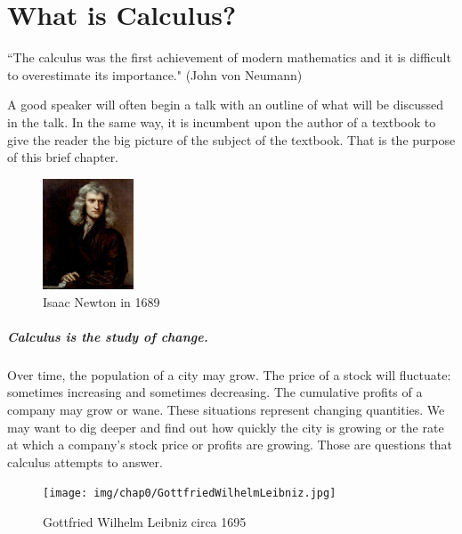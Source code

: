 \chapter{What is Calculus?}
\label{ch:whatiscalculus}

\begin{center}
``The calculus was the first achievement of modern mathematics and it is difficult to overestimate its importance." (John von Neumann)
\end{center}



A good speaker will often begin a talk with an outline of what will be discussed in the talk. In the same way, it is incumbent upon the author of a textbook to give the reader the big picture of the subject of the textbook. That is the purpose of this brief chapter.

\begin{figure}
  \vspace{-20pt}
  \centering
    \includegraphics[width=0.24\textwidth]{img/chap0/IsaacNewton.jpg}
\caption{Isaac Newton in 1689}
\vspace{-10pt}
\end{figure}

\paragraph{Calculus is the study of change.} Over time, the population of a city may grow. The price of a stock will fluctuate: sometimes increasing and sometimes decreasing. The cumulative profits of a company may grow or wane. These situations represent changing quantities. We may want to dig deeper and find out how quickly the city is growing or the rate at which a company's stock price or profits are growing. Those are questions that calculus attempts to answer.

\begin{figure}
\vspace{-10pt} 
 \centering
    \texttt{[image: img/chap0/GottfriedWilhelmLeibniz.jpg]}
  \caption{Gottfried Wilhelm Leibniz circa 1695}
\vspace{-60pt}
\end{figure}

